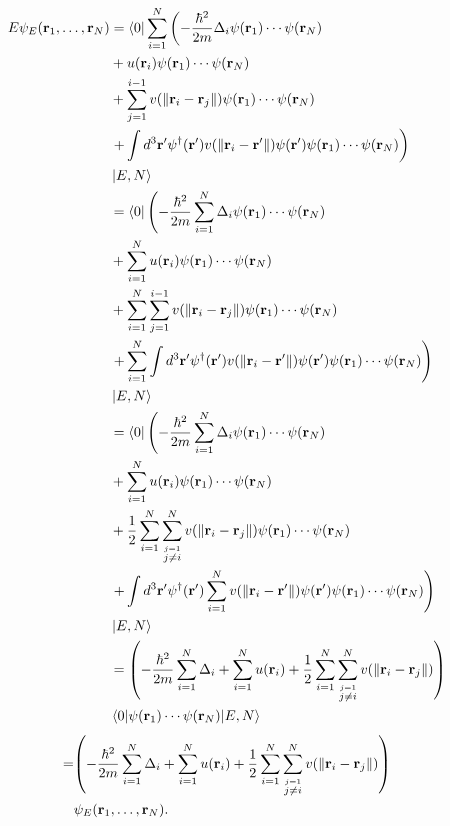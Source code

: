\documentclass{article}
\begin{document}
\begin{align}
\begin{split}
E\psi_E(\vb{r}_1,\dots,\vb{r}_N)&=\bra{0}\sum_{i=1}^N\left(- \frac{\hbar^2}{2m}\Delta_i\psi(\vb{r}_1)\cdots\psi(\vb{r}_N)\right.\\
&+ u(\vb{r}_i)\psi(\vb{r}_1)\cdots\psi(\vb{r}_N)\\
&+\sum_{j=1}^{i-1} v(\|\vb{r}_i-\vb{r}_{j}\|)\psi(\vb{r}_1)\cdots\psi(\vb{r}_N)\\
&\left.+ \int d^3\vb{r}'\psi^\dagger(\vb{r}')v(\|\vb{r}_i-\vb{r}'\|)\psi(\vb{r}') \psi(\vb{r}_1)\cdots\psi(\vb{r}_N)\right)\\
&\ket{E,N}\\
&=\bra{0}\left(- \frac{\hbar^2}{2m}\sum_{i=1}^N\Delta_i\psi(\vb{r}_1)\cdots\psi(\vb{r}_N)\right.\\
&+ \sum_{i=1}^Nu(\vb{r}_i)\psi(\vb{r}_1)\cdots\psi(\vb{r}_N)\\
&+\sum_{i=1}^N\sum_{j=1}^{i-1} v(\|\vb{r}_i-\vb{r}_{j}\|)\psi(\vb{r}_1)\cdots\psi(\vb{r}_N)\\
&\left.+ \sum_{i=1}^N\int d^3\vb{r}'\psi^\dagger(\vb{r}')v(\|\vb{r}_i-\vb{r}'\|)\psi(\vb{r}') \psi(\vb{r}_1)\cdots\psi(\vb{r}_N)\right)\\
&\ket{E,N}\\
&=\bra{0}\left(- \frac{\hbar^2}{2m}\sum_{i=1}^N\Delta_i\psi(\vb{r}_1)\cdots\psi(\vb{r}_N)\right.\\
&+ \sum_{i=1}^Nu(\vb{r}_i)\psi(\vb{r}_1)\cdots\psi(\vb{r}_N)\\
&+\frac{1}{2}\sum_{i=1}^N\sum_{\overset{j=1}{j\neq i}}^N v(\|\vb{r}_i-\vb{r}_{j}\|)\psi(\vb{r}_1)\cdots\psi(\vb{r}_N)\\
&\left.+ \int d^3\vb{r}'\psi^\dagger(\vb{r}')\sum_{i=1}^Nv(\|\vb{r}_i-\vb{r}'\|)\psi(\vb{r}') \psi(\vb{r}_1)\cdots\psi(\vb{r}_N)\right)\\
&\ket{E,N}\\
&=\qty(- \frac{\hbar^2}{2m}\sum_{i=1}^N\Delta_i+ \sum_{i=1}^Nu(\vb{r}_i)+\frac{1}{2}\sum_{i=1}^N\sum_{\overset{j=1}{j\neq i}}^N v(\|\vb{r}_i-\vb{r}_{j}\|))\\
&\mel{0}{\psi(\vb{r}_1)\cdots\psi(\vb{r}_N)}{E,N}
\end{split}
\end{align}
\begin{align*}
=&\qty(- \frac{\hbar^2}{2m}\sum_{i=1}^N\Delta_i+ \sum_{i=1}^Nu(\vb{r}_i)+\frac{1}{2}\sum_{i=1}^N\sum_{\overset{j=1}{j\neq i}}^N v(\|\vb{r}_i-\vb{r}_{j}\|))\\
&\psi_E(\vb{r}_1,\dots,\vb{r}_N).
\end{align*}
\end{document}
